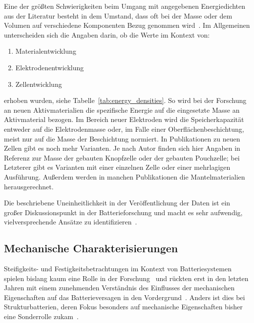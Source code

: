 Eine der größten Schwierigkeiten beim Umgang mit angegebenen Energiedichten aus der Literatur besteht in dem Umstand, dass oft bei der Masse oder dem Volumen auf verschiedene Komponenten Bezug genommen wird~\cite{Son2021}. Im Allgemeinen unterscheiden sich die Angaben darin, ob die Werte im Kontext von:
\begin{enumerate}
	\item Materialentwicklung
	\item Elektrodenentwicklung
	\item Zellentwicklung
\end{enumerate}
erhoben wurden, siehe Tabelle~\ref{tab:energy_densities}.
So wird bei der Forschung an neuen Aktivmaterialien die spezifische Energie auf die eingesetzte Masse an Aktivmaterial bezogen. Im Bereich neuer Elektroden wird die Speicherkapazität entweder auf die Elektrodenmasse oder, im Falle einer Oberflächenbeschichtung, meist nur auf die Masse der Beschichtung normiert. In Publikationen zu neuen Zellen gibt es noch mehr Varianten. Je nach Autor finden sich hier Angaben in Referenz zur Masse der gebauten Knopfzelle oder der gebauten Pouchzelle; bei Letzterer gibt es Varianten mit einer einzelnen Zelle oder einer mehrlagigen Ausführung. Außerdem werden in manchen Publikationen die Mantelmaterialien herausgerechnet.

Die beschriebene Uneinheitlichkeit in der Veröffentlichung der Daten ist ein großer Diskussionspunkt in der Batterieforschung und macht es sehr aufwendig, vielversprechende Ansätze zu identifizieren~\cite{Greenhalgh2023, Zschiebsch2024}.

\subsection{Mechanische Charakterisierungen}
Steifigkeits- und Festigkeitsbetrachtungen im Kontext von Batteriesystemen spielen bislang kaum eine Rolle in der Forschung~\cite{Chen2024a} und rückten erst in den letzten Jahren mit einem zunehmenden Verständnis des Einflusses der mechanischen Eigenschaften auf das Batterieversagen in den Vordergrund~\cite{Zhu2023}. Anders ist dies bei Strukturbatterien, deren Fokus besonders auf mechanische Eigenschaften bisher eine Sonderrolle zukam~\cite{Asp2021}.

